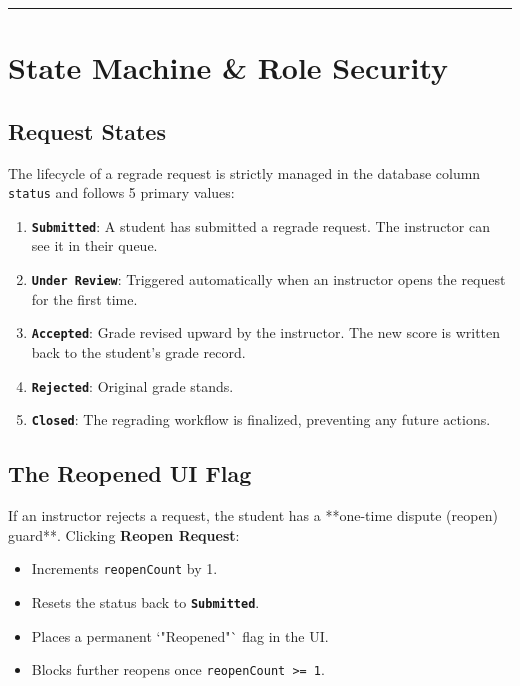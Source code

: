 \documentclass{article}
\begin{document}
\begin{center}\rule{0.5\linewidth}{0.5pt}\end{center}

\section{State Machine \& Role Security}

\subsection{Request States}
The lifecycle of a regrade request is strictly managed in the database column \texttt{status} and follows 5 primary values:
\begin{enumerate}
    \item \textbf{\texttt{Submitted}}: A student has submitted a regrade request. The instructor can see it in their queue.
    \item \textbf{\texttt{Under Review}}: Triggered automatically when an instructor opens the request for the first time.
    \item \textbf{\texttt{Accepted}}: Grade revised upward by the instructor. The new score is written back to the student's grade record.
    \item \textbf{\texttt{Rejected}}: Original grade stands.
    \item \textbf{\texttt{Closed}}: The regrading workflow is finalized, preventing any future actions.
\end{enumerate}

\subsection{The Reopened UI Flag}
If an instructor rejects a request, the student has a **one-time dispute (reopen) guard**. 
Clicking \textbf{Reopen Request}:
\begin{itemize}
    \item Increments \texttt{reopenCount} by 1.
    \item Resets the status back to \textbf{\texttt{Submitted}}.
    \item Places a permanent `"Reopened"` flag in the UI.
    \item Blocks further reopens once \texttt{reopenCount >= 1}.
\end{itemize}
\end{document}
